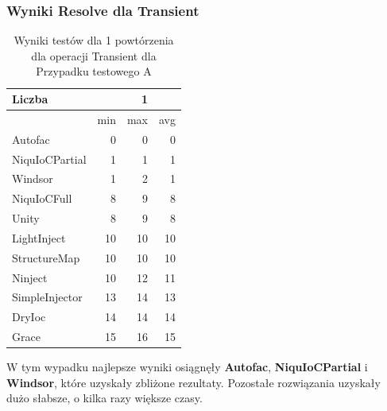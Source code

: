 \documentclass[12pt]{article}
\begin{document}
\subsubsection{Wyniki Resolve dla Transient}
\begin{table}[H]
\captionsetup{belowskip=0pt,aboveskip=0pt}
\begin{center}
\begin{small}
	\begin{tabular}{ | l | r r r | }
    		\hline
Liczba & & 1 & \\ \hline
 & min & max & avg \\ \hline
Autofac & 0 & 0 & 0 \\ \hline
NiquIoCPartial & 1 & 1 & 1 \\ \hline
Windsor & 1 & 2 & 1 \\ \hline
NiquIoCFull & 8 & 9 & 8 \\ \hline
Unity & 8 & 9 & 8 \\ \hline
LightInject & 10 & 10 & 10 \\ \hline
StructureMap & 10 & 10 & 10 \\ \hline
Ninject & 10 & 12 & 11 \\ \hline
SimpleInjector & 13 & 14 & 13 \\ \hline
DryIoc & 14 & 14 & 14 \\ \hline
Grace & 15 & 16 & 15 \\ \hline
  	\end{tabular}
\end{small}
\end{center}
\caption{Wyniki testów dla 1 powtórzenia dla operacji Transient dla Przypadku testowego A}
\label{TestCaseA_Transient1}
\end{table}
W tym wypadku najlepsze wyniki osiągnęły \textbf{Autofac}, \textbf{NiquIoCPartial} i \textbf{Windsor}, które uzyskały zbliżone rezultaty. Pozostałe rozwiązania uzyskały dużo słabsze, o kilka razy większe czasy.
\\ \\
\end{document}
